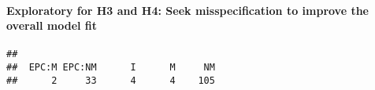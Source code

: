 \documentclass[
]{article}
\newenvironment{Shaded}{\begin{snugshade}}{\end{snugshade}}
\newcommand{\CommentTok}[1]{\textcolor[rgb]{0.56,0.35,0.01}{\textit{#1}}}
\newcommand{\DataTypeTok}[1]{\textcolor[rgb]{0.13,0.29,0.53}{#1}}
\newcommand{\DecValTok}[1]{\textcolor[rgb]{0.00,0.00,0.81}{#1}}
\newcommand{\KeywordTok}[1]{\textcolor[rgb]{0.13,0.29,0.53}{\textbf{#1}}}
\newcommand{\NormalTok}[1]{#1}
\newcommand{\OperatorTok}[1]{\textcolor[rgb]{0.81,0.36,0.00}{\textbf{#1}}}
\newcommand{\StringTok}[1]{\textcolor[rgb]{0.31,0.60,0.02}{#1}}
\begin{document}
\hypertarget{exploratory-for-h3-and-h4-seek-misspecification-to-improve-the-overall-model-fit}{%
\paragraph{Exploratory for H3 and H4: Seek misspecification to improve
the overall model
fit}\label{exploratory-for-h3-and-h4-seek-misspecification-to-improve-the-overall-model-fit}}

\begin{Shaded}
\end{Shaded}

\begin{verbatim}
## 
##  EPC:M EPC:NM      I      M     NM 
##      2     33      4      4    105
\end{verbatim}
\end{document}
